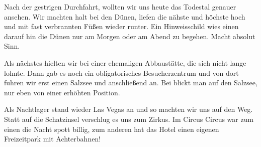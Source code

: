 Nach der gestrigen Durchfahrt, wollten wir uns heute das Todestal genauer ansehen.
Wir machten halt bei den Dünen, liefen die nähste und höchste hoch und mit fast verbrannten Füßen wieder runter.
Ein Hinweisschild wies einen darauf hin die Dünen nur am Morgen oder am Abend zu begehen.
Macht absolut Sinn.

\thispagestyle{empty}
\newpage

Als nächstes hielten wir bei einer ehemaligen Abbaustätte, die sich nicht lange lohnte.
Dann gab es noch ein obligatorisches Besucherzentrum und von dort fuhren wir erst einen Salzsee und anschließend  an.
Bei  blickt man auf den Salzsee, nur eben von einer erhöhten Position.

Als Nachtlager stand wieder Las Vegas an und so machten wir uns auf den Weg.
Statt auf die Schatzinsel verschlug es uns zum Zirkus.
Im Circus Circus war zum einen die Nacht spott billig, zum anderen hat das Hotel einen eigenen Freizeitpark mit Achterbahnen!

\thispagestyle{empty}
\newpage

